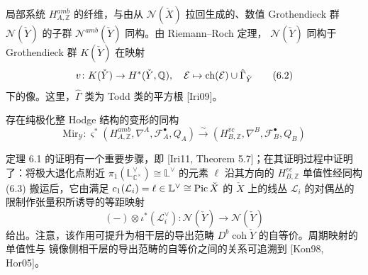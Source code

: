 

局部系统 $H^{amb}_{A,\mathbb{Z}}$ 的纤维，与由从 $\mathcal{N}(\check{X})$ 拉回生成的、数值 Grothendieck
群 $\mathcal{N}(\check{Y})$ 的子群 $\mathcal{N}^{amb}(\check{Y})$ 同构。由 Riemann–Roch 定理，
$\mathcal{N}(\check{Y})$ 同构于 Grothendieck 群 $K(\check{Y})$ 在映射
\begin{equation}
  v\colon K(\check{Y})\to H^{*}(\check{Y},\mathbb{Q}),\quad
  \mathcal{E}\mapsto\operatorname{ch}(\mathcal{E})\cup\hat{\Gamma}_{\check{Y}} \tag{6.2}
\end{equation}
下的像。这里，$\hat{\Gamma}$ 类为 Todd 类的平方根 [Iri09]。

\begin{theorem}
  存在纯极化整 Hodge 结构的变形的同构
  \begin{equation}
    \mathrm{Mir}_{\mathcal{Y}}\colon
    \varsigma^{*}(H^{amb}_{A,\mathbb{Z}},\nabla^{A},\mathscr{F}^{\bullet}_{A},Q_{A})
    \xrightarrow{\sim}(H^{vc}_{B,\mathbb{Z}},\nabla^{B},\mathscr{F}^{\bullet}_{B},Q_{B}) \tag{6.3}
  \end{equation}
\end{theorem}

定理 6.1 的证明有一个重要步骤，即 [Iri11, Theorem 5.7]；在其证明过程中证明了：将极大退化点附近
$\pi_{1}(\mathbb{L}^{\vee}_{\mathbb{C}^{\times}})\cong\mathbb{L}^{\vee}$ 的元素 $\ell$ 沿其方向的
$H^{vc}_{B,\mathbb{Z}}$ 单值性经同构 (6.3) 搬运后，它由满足
$c_{1}(\mathcal{L}_{i})=\ell\in\mathbb{L}^{\vee}\cong\operatorname{Pic}\check{X}$ 的 $\check{X}$ 上的线丛
$\mathcal{L}_{i}$ 的对偶丛的限制作张量积所诱导的等距映射
\begin{equation}
  (-)\otimes\iota^{*}(\mathcal{L}_{i}^{\vee})\colon
  \mathcal{N}(\check{Y})\to\mathcal{N}(\check{Y}) \tag{6.4}
\end{equation}
给出。注意，该作用可提升为相干层的导出范畴 $D^{b}\operatorname{coh}\check{Y}$ 的自等价。周期映射的单值性与
镜像侧相干层的导出范畴的自等价之间的关系可追溯到 [Kon98, Hor05]。

